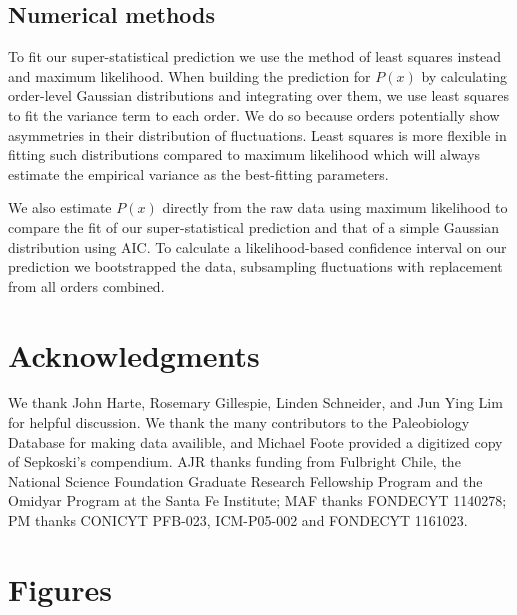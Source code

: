 \documentclass[12pt]{article}
\begin{document}
\subsection*{Numerical methods} \label{sec:numMeth} To fit our
super-statistical prediction we use the method of least squares
instead and maximum likelihood. When building the prediction for
$P(x)$ by calculating order-level Gaussian distributions and
integrating over them, we use least squares to fit the variance term
to each order. We do so because orders potentially show asymmetries in
their distribution of fluctuations. Least squares is more flexible in
fitting such distributions compared to maximum likelihood which will
always estimate the empirical variance as the best-fitting parameters.

We also estimate $P(x)$ directly from the raw data using maximum
likelihood to compare the fit of our super-statistical prediction and
that of a simple Gaussian distribution using AIC. To calculate a
likelihood-based confidence interval on our prediction we bootstrapped
the data, subsampling fluctuations with replacement from all orders
combined.

\section*{Acknowledgments}
We thank John Harte, Rosemary Gillespie, Linden Schneider, and Jun
Ying Lim for helpful discussion. We thank the many contributors to the
Paleobiology Database for making data availible, and Michael Foote
provided a digitized copy of Sepkoski's compendium. AJR thanks funding
from Fulbright Chile, the National Science Foundation Graduate
Research Fellowship Program and the Omidyar Program at the Santa Fe
Institute; MAF thanks FONDECYT 1140278; PM thanks CONICYT PFB-023,
ICM-P05-002 and FONDECYT 1161023.

\printbibliography

\clearpage

\section*{Figures}
\end{document}
